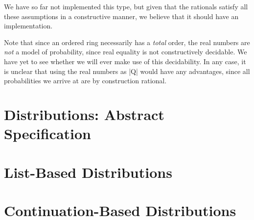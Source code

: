 We have so far not implemented this type, but given that the rationals satisfy all these assumptions in a constructive
manner, we believe that it should have an implementation.

Note that since an ordered ring necessarily has a \emph{total} order, the real numbers are \emph{not} a model of
probability, since real equality is not constructively decidable.  We have yet to see whether we will ever make use of
this decidability.  In any case, it is unclear that using the real numbers as |Q| would have any advantages, since all
probabilities we arrive at are by construction rational.

\section{Distributions: Abstract Specification}

\section{List-Based Distributions}

\section{Continuation-Based Distributions}


